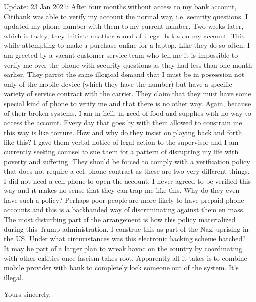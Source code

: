 \documentclass[a4paper]{arthur-letter}
\begin{document}
\begin{letter}
    Update: 23 Jan 2021: After four months without access to my bank account, Citibank was able to verify my account the normal way, i.e. security questions. I updated my phone number with them to my current number. Two weeks later, which is today, they initiate another round of illegal holds on my account. This while attempting to make a purchase online for a laptop. Like they do so often, I am greeted by a vacant customer service team who tell me it is impossible to verify me over the phone with security questions as they had less than one month earlier. They parrot the same illogical demand that I must be in possession not only of the mobile device (which they have the number) but have a specific variety of
    service contract with the carrier. They claim that they must have some special kind of phone to verify me and that there is no other way. Again, because of their broken systems, I am in hell, in need of food and supplies with no way to access the account. Every day that goes by with them allowed to constrain me this way is like torture. How and why do they insist on playing back and forth like this? I gave them verbal notice of legal action to the supervisor and I am currently seeking counsel to sue them for a pattern of disrupting my life with poverty and suffering. They should be forced to comply with a verification policy that does not require a cell phone contract as these are two very different things. I did not need a cell phone to open the account, I never agreed to be verified this way and it makes no sense that they can trap me like this. Why do they even have such a policy? Perhaps poor people are more likely to have prepaid phone accounts and this is a backhanded way of discriminating against them en mass. The most disturbing part of the arrangement is how this policy materialized during this Trump administration. I construe this as part of the Nazi uprising in the US. Under what circumstances was this electronic hacking scheme hatched? It may be part of a larger plan to wreak havoc on the country by coordinating with other entities once fascism takes root. Apparently all it takes is to combine mobile provider with bank to completely lock someone out of the system. It's illegal.
    
            
            \closing{Yours sincerely,} %


    \end{letter}
    
\end{document}
